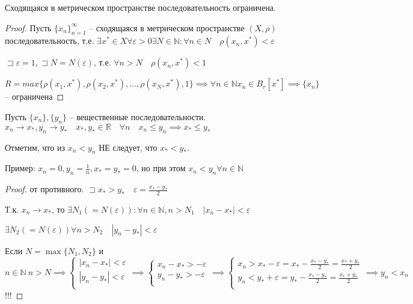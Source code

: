\documentclass{book}
\newcommand\N{\ensuremath{\mathbb{N}}}
\newcommand\R{\ensuremath{\mathbb{R}}}
\theoremstyle{definition}
\begin{document}
    \begin{theorem}
        Сходящаяся в метрическом пространстве последовательность ограничена.
    \end{theorem}
    \begin{proof}
        Пусть $\{x_n\}_{n=1}^{\infty }$ -- сходящаяся в метрическом пространстве $(X,\rho)$ последовательность, т.е. $\exists x^*\in X\forall \varepsilon>0 \exists N\in \N :\forall n\in N \quad\rho( x_n,x^*)<\varepsilon$

        $\sqsupset \varepsilon = 1, \sqsupset N = N(\varepsilon)$, т.е. $\forall n>N\quad \rho(x_n, x^*)<1$

        $R = max\{\rho(x_1, x^*), \rho(x_2, x^*), \ldots, \rho(x_N, x^*), 1\} \implies \forall n\in \N  x_{n} \in B_r[x^*] \implies \{x_n\}$ -- ограничена
    \end{proof}

    \begin{theorem}

        Пусть $\{x_{n} \}, \{y_{n} \}$ -- вещественные последовательности. 
        $x_n\to x_*, y_n\to y_*\quad x_*, y_*\in \R\quad \forall n\quad x_{n} \leqslant y_{n} \implies  x_*\leqslant y_*$

        Отметим, что из $x_{n} <y_{n} $ НЕ следует, что $x_*<y_*$.

        Пример: $x_{n} =0, y_{n}  = \frac{1}{n}, x_* = y_* =  0$, но при этом $x_n<y_n \forall n\in \N $
    \end{theorem}
    \begin{proof}
        от противного. $\sqsupset  x_*>y_*\quad \varepsilon = \frac{x_*-y_*}{2}$

        Т.к. $x_{n} \to x_*$, то $\exists N_1\left( =N(\varepsilon) \right): \forall n\in \N , n>N_1\quad \left| x_n-x_* \right| <\varepsilon $

        $\exists N_2\left( =N(\varepsilon) \right) \forall n>N_2\quad \left| y_n-y_* \right| <\varepsilon$

        Если $N = \max\{N_1, N_2\}$ и $n\in \N ~n>N \implies \begin{cases}
            \left| x_n-x_* \right| <\varepsilon\\
            \left| y_n-y_* \right| <\varepsilon\\
        \end{cases} \implies \begin{cases}
            x_n-x_* >-\varepsilon\\
            y_n-y_* >-\varepsilon\\
        \end{cases} \implies \begin{cases}
            x_n>x_*-\varepsilon = x_* - \frac{x_*-y_*}{2} = \frac{x_*+y_*}{2}\\
            y_n<y_*+\varepsilon = y_* - \frac{x_*-y_*}{2} = \frac{x_*+y_*}{2}\\
        \end{cases} \implies  y_n<x_n$ !!!
    \end{proof}
\end{document}
